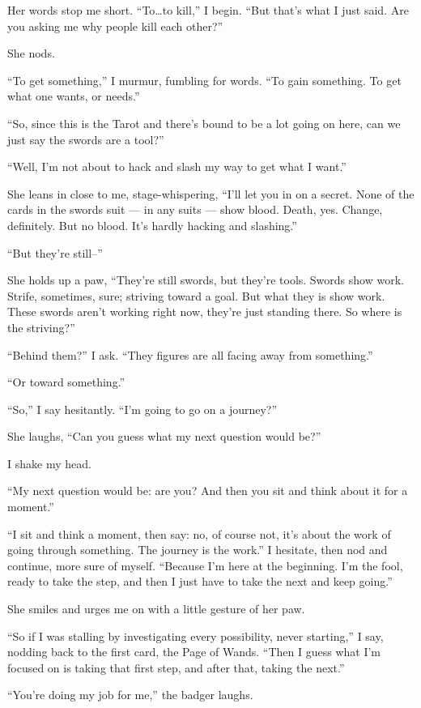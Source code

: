 Her words stop me short. ``To\ldots{}to kill,'' I begin. ``But that's what I just said. Are you asking me why people kill each other?''

She nods.

``To get something,'' I murmur, fumbling for words. ``To gain something. To get what one wants, or needs.''

``So, since this is the Tarot and there's bound to be a lot going on here, can we just say the swords are a tool?''

``Well, I'm not about to hack and slash my way to get what I want.''

She leans in close to me, stage-whispering, ``I'll let you in on a secret. None of the cards in the swords suit --- in any suits --- show blood. Death, yes. Change, definitely. But no blood. It's hardly hacking and slashing.''

``But they're still--''

She holds up a paw, ``They're still swords, but they're tools. Swords show work. Strife, sometimes, sure; striving toward a goal. But what they is show work. These swords aren't working right now, they're just standing there. So where is the striving?''

``Behind them?'' I ask. ``They figures are all facing away from something.''

``Or toward something.''

``So,'' I say hesitantly. ``I'm going to go on a journey?''

She laughs, ``Can you guess what my next question would be?''

I shake my head.

``My next question would be: are you? And then you sit and think about it for a moment.''

``I sit and think a moment, then say: no, of course not, it's about the work of going through something. The journey is the work.'' I hesitate, then nod and continue, more sure of myself. ``Because I'm here at the beginning. I'm the fool, ready to take the step, and then I just have to take the next and keep going.''

She smiles and urges me on with a little gesture of her paw.

``So if I was stalling by investigating every possibility, never starting,'' I say, nodding back to the first card, the Page of Wands. ``Then I guess what I'm focused on is taking that first step, and after that, taking the next.''

``You're doing my job for me,'' the badger laughs.

